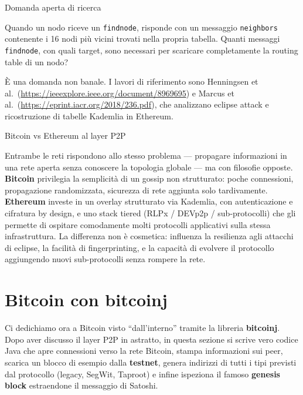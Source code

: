 \documentclass[
  italian,
  openany]{book}
\begin{document}
\begin{calloutquestion}{Domanda aperta di ricerca}

Quando un nodo riceve un \texttt{findnode}, risponde con un messaggio
\texttt{neighbors} contenente i 16 nodi più vicini trovati nella propria
tabella. Quanti messaggi \texttt{findnode}, con quali target, sono
necessari per scaricare completamente la routing table di un nodo?

È una domanda non banale. I lavori di riferimento sono Henningsen et
al.~(\url{https://ieeexplore.ieee.org/document/8969695}) e Marcus et
al.~(\url{https://eprint.iacr.org/2018/236.pdf}), che analizzano eclipse
attack e ricostruzione di tabelle Kademlia in Ethereum.

\end{calloutquestion}

\begin{calloutnote}{Bitcoin vs Ethereum al layer P2P}

Entrambe le reti rispondono allo stesso problema --- propagare
informazioni in una rete aperta senza conoscere la topologia globale ---
ma con filosofie opposte. \textbf{Bitcoin} privilegia la semplicità di
un gossip non strutturato: poche connessioni, propagazione randomizzata,
sicurezza di rete aggiunta solo tardivamente. \textbf{Ethereum} investe
in un overlay strutturato via Kademlia, con autenticazione e cifratura
by design, e uno stack tiered (RLPx / DEVp2p / sub-protocolli) che gli
permette di ospitare comodamente molti protocolli applicativi sulla
stessa infrastruttura. La differenza non è cosmetica: influenza la
resilienza agli attacchi di eclipse, la facilità di fingerprinting, e la
capacità di evolvere il protocollo aggiungendo nuovi sub-protocolli
senza rompere la rete.

\end{calloutnote}

\section{Bitcoin con bitcoinj}\label{bitcoin-con-bitcoinj}

Ci dedichiamo ora a Bitcoin visto ``dall'interno'' tramite la libreria
\textbf{bitcoinj}. Dopo aver discusso il layer P2P in astratto, in
questa sezione si scrive vero codice Java che apre connessioni verso la
rete Bitcoin, stampa informazioni sui peer, scarica un blocco di esempio
dalla \textbf{testnet}, genera indirizzi di tutti i tipi previsti dal
protocollo (legacy, SegWit, Taproot) e infine ispeziona il famoso
\textbf{genesis block} estraendone il messaggio di Satoshi.
\end{document}
